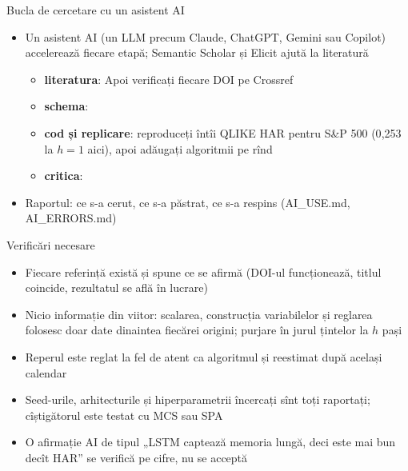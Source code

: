 \begin{frame}{Bucla de cercetare cu un asistent AI}
\itemsize{\footnotesize}
\begin{itemize}
    \item Un asistent AI (un LLM precum Claude, ChatGPT, Gemini sau Copilot) accelerează fiecare etapă; Semantic Scholar și Elicit ajută la literatură
    \begin{itemize}
        \item \textbf{literatura}:  Apoi verificați fiecare DOI pe Crossref
        \item \textbf{schema}: 
        \item \textbf{cod și replicare}: reproduceți întîi QLIKE HAR pentru S\&P 500 (0{,}253 la $h = 1$ aici), apoi adăugați algoritmii pe rînd
        \item \textbf{critica}: 
    \end{itemize}
    \item Raportul: ce s-a cerut, ce s-a păstrat, ce s-a respins (AI\_USE.md, AI\_ERRORS.md)
\end{itemize}
\end{frame}

\begin{frame}{Verificări necesare}
\itemsize{\small}
\begin{itemize}
    \item Fiecare referință există și spune ce se afirmă (DOI-ul funcționează, titlul coincide, rezultatul se află în lucrare)
    \item Nicio informație din viitor: scalarea, construcția variabilelor și reglarea folosesc doar date dinaintea fiecărei origini; purjare în jurul țintelor la $h$ pași
    \item Reperul este reglat la fel de atent ca algoritmul și reestimat după același calendar
    \item Seed-urile, arhitecturile și hiperparametrii încercați sînt toți raportați; cîștigătorul este testat cu MCS sau SPA
    \item O afirmație AI de tipul „LSTM captează memoria lungă, deci este mai bun decît HAR” se verifică pe cifre, nu se acceptă
\end{itemize}
\end{frame}

